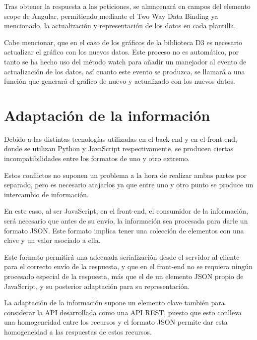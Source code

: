 \documentclass[a4paper, spanish, 12pt]{book}
\begin{document}
Tras obtener la respuesta a las peticiones, se almacenar\'a en campos del elemento
\textdollar scope de Angular, permitiendo mediante el Two Way Data Binding ya mencionado,
la actualizaci\'on y representaci\'on de los datos en cada plantilla.

Cabe mencionar, que en el caso de los gr\'aficos de la biblioteca D3 es necesario
actualizar el gr\'afico con los nuevos datos. Este proceso no es autom\'atico,
por tanto se ha hecho uso del m\'etodo \textdollar watch para a\~nadir un manejador al evento de
actualizaci\'on de los datos, as\'i cuanto este evento se produzca, se llamar\'a
a una funci\'on que generar\'a el gr\'afico de nuevo y actualizado con los nuevos
datos.

\section{Adaptaci\'on de la informaci\'on}
\label{sec:adaptation}

Debido a las distintas tecnolog\'ias utilizadas en el back-end y en el front-end,
donde se utilizan Python y JavaScript respectivamente, se producen ciertas incompatibilidades
entre los formatos de uno y otro extremo.

Estos conflictos no suponen un problema a la hora de realizar ambas partes por
separado, pero es necesario atajarlos ya que entre uno y otro punto se produce
un intercambio de informaci\'on.

En este caso, al ser JavaScript, en el front-end, el consumidor de la informaci\'on,
ser\'a necesario que antes de su env\'io, la informaci\'on sea procesada para darle
un formato JSON. Este formato implica tener una colecci\'on de elementos con una
clave y un valor asociado a ella.

Este formato permitir\'a una adecuada serializaci\'on desde el servidor al cliente
para el correcto env\'io de la respuesta, y que en el front-end no se requiera ning\'un
procesado especial de la respuesta, m\'as que el de un elemento JSON propio de JavaScript,
y su posterior adaptaci\'on para su representaci\'on.

La adaptaci\'on de la informaci\'on supone un elemento clave tambi\'en para considerar
la API desarrollada como una API REST, puesto que esto conlleva una homogeneidad entre los
recursos y el formato JSON permite dar esta homogeneidad a las respuestas de estos recursos.

\end{document}
